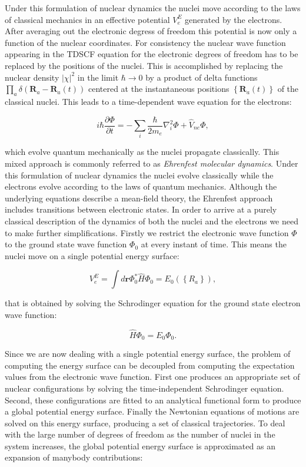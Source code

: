 Under this formulation of nuclear dynamics
the nuclei move according to the laws of classical
mechanics in an effective potential $V_e^E$ generated
by the electrons.
After averaging out the electronic degress of freedom
this potential is now only a function of the nuclear coordinates.
For consistency the nuclear wave function appearing
in the TDSCF equation for the electronic
degrees of freedom has to be replaced by the positions
of the nuclei.
This is accomplished by replacing the nuclear density 
$\left| \chi \right|^2$ in the limit $\hbar \rightarrow 0$
by a product of delta functions
$ \prod_a \delta (\bm{R}_a - \bm{R}_a(t)) $ centered
at the instantaneous positions $\left\{ \bm{R}_a(t) \right\}$
of the classical nuclei.
This leads to a time-dependent wave equation
for the electrons:

\begin{equation}
 i\hbar\frac{\partial \Phi}{\partial t} =
    -\sum_i \frac{\hbar}{2m_e} \nabla_i^2 \Phi
    + \hat{V}_{ne} \Phi , 
\end{equation}

which evolve quantum mechanically as the nuclei propagate
classically. This mixed approach is commonly referred to as
\textit{Ehrenfest molecular dynamics}.
Under this formulation of nuclear dynamics the
nuclei evolve classically while the electrons
evolve according to the laws of quantum mechanics.
Although the underlying equations describe a mean-field
theory, the Ehrenfest approach includes transitions
between electronic states.
In order to arrive at a purely classical description of the
dynamics of both the nuclei and the electrons
we need to make further simplifications.
Firstly we restrict the electronic wave function $\Phi$
to the ground state wave function $\Phi_0$
at every instant of time. 
This means the nuclei move on a single potential energy surface:

\begin{equation}
 V_e^E = \int d\bm{r} \Phi_0^* \hat{H} \Phi_0 
    = E_0 \left(\left\{ R_a \right\}\right) , 
\end{equation}

that is obtained by solving the Schrodinger equation
for the ground state electron wave function:

\begin{equation}
 \hat{H} \Phi_0 = E_0 \Phi_0 . 
\end{equation}

Since we are now dealing with a single potential
energy surface, the problem of computing the energy surface
can be decoupled from computing the
expectation values from the electronic wave function.
First one produces an appropriate set of nuclear configurations
by solving the time-independent Schrodinger equation.
Second, these configurations are fitted to an analytical
functional form to produce a global potential energy surface.
Finally the Newtonian equations of motions are solved
on this energy surface, producing a set of classical trajectories.
To deal with the large number of degrees of freedom
as the number of nuclei in the system increases,
the global potential energy surface
is approximated as an expansion of manybody contributions:

